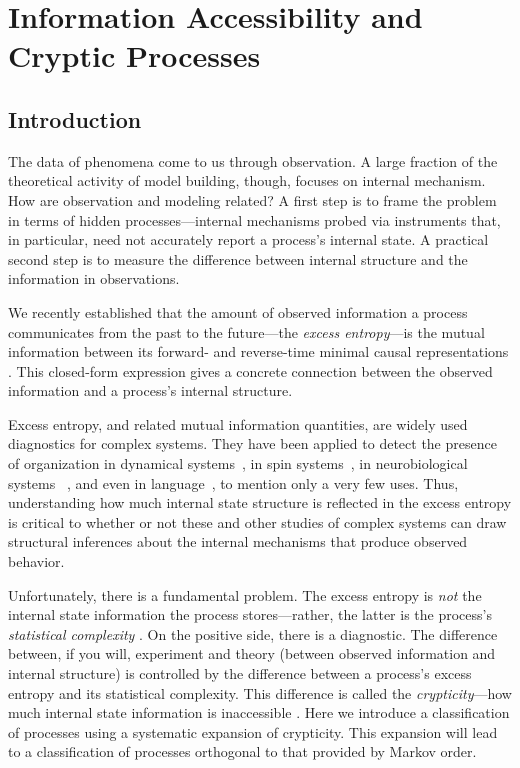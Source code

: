 \ifx\master\undefined\fi


\chapter{Information Accessibility and Cryptic Processes}
\label{ch:IACP}

\section{Introduction}

The data of phenomena come to us through observation. A large fraction of the
theoretical activity of model building, though, focuses on internal mechanism.
How are observation and modeling related? A first step is to frame the problem
in terms of hidden processes---internal mechanisms probed via instruments that,
in particular, need not accurately report a process's internal state. A
practical second step is to measure the difference between internal structure
and the information in observations.

We recently established that the amount of observed information a process
communicates from the past to the future---the \emph{excess entropy}---is the
mutual information between its forward- and reverse-time minimal causal
representations \cite{Crut08a,Crut08b}. This closed-form expression gives a
concrete connection between the observed information and a process's internal
structure.

Excess entropy, and related mutual information quantities, are widely used
diagnostics for complex systems. They have been applied to detect the presence
of organization in dynamical systems~\cite{Fras90b,Casd91a,Spro03a,Kant06a},
in spin systems~\cite{Arno96,Crut97a,Feld98b}, in neurobiological systems~%
\cite{Tono94a,Bial00a}, and even in language~\cite{Ebel94c,Debo08a}, to mention
only a very few uses. Thus, understanding how much internal state structure is
reflected in the excess entropy is critical to whether or not these and other
studies of complex systems can draw structural inferences about the internal
mechanisms that produce observed behavior.

Unfortunately, there is a fundamental problem. The excess entropy is \emph{not}
the internal state information the process stores---rather, the latter is the
process's \emph{statistical complexity} \cite{Crut08a,Crut08b}. On the positive
side, there is a diagnostic. The difference between, if you will, experiment and
theory (between observed information and internal structure) is controlled by
the difference between a process's excess entropy and its statistical
complexity. This difference is called the \emph{crypticity}---how much internal
state information is inaccessible \cite{Crut08a,Crut08b}. Here we introduce a
classification of processes using a systematic expansion of crypticity. This expansion will lead to a classification of processes orthogonal to that provided by Markov order.

